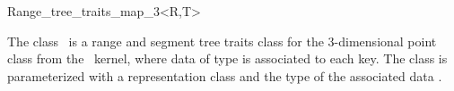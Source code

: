 \begin{ccRefClass} {Range_tree_traits_map_3<R,T>}

\ccDefinition
The class \ccClassName\ is a range and segment tree traits class for the 3-dimensional
point class from the \cgal\ kernel,  where data of
type  is associated to each key.
The class is parameterized with a representation class  and the type of
the associated data .


\ccTypes
{}


\end{ccRefClass} 
